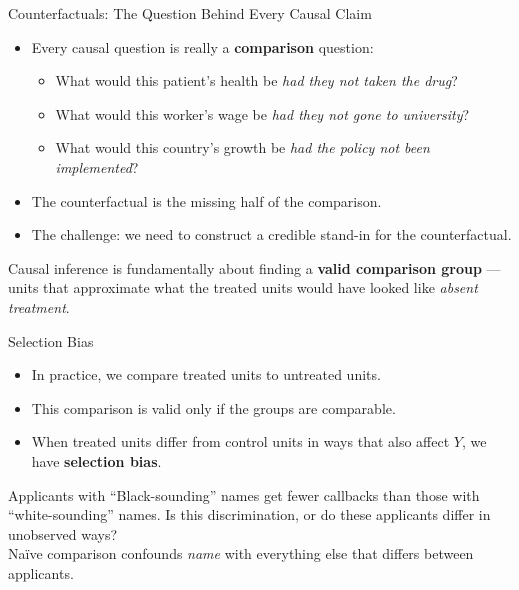 \documentclass[aspectratio=169, 11pt]{beamer}
\begin{document}
\begin{frame}[t]{Counterfactuals: The Question Behind Every Causal Claim}
\begin{itemize}
  \setlength\itemsep{0.5em}
  \item Every causal question is really a \textbf{comparison} question:
  \begin{itemize}
    \item What would this patient's health be \emph{had they not taken the drug}?
    \item What would this worker's wage be \emph{had they not gone to university}?
    \item What would this country's growth be \emph{had the policy not been implemented}?
  \end{itemize}
  \item The counterfactual is the missing half of the comparison.
  \item The challenge: we need to construct a credible stand-in for the counterfactual.
\end{itemize}
\vspace{0.4em}
\begin{intuitionbox}
Causal inference is fundamentally about finding a \textbf{valid comparison group}
— units that approximate what the treated units would have looked like \emph{absent treatment}.
\end{intuitionbox}
\end{frame}

\begin{frame}[t]{Selection Bias}
\begin{itemize}
  \setlength\itemsep{0.45em}
  \item In practice, we compare treated units to untreated units.
  \item This comparison is valid only if the groups are comparable.
  \item When treated units differ from control units in ways that also affect $Y$,
        we have \textbf{selection bias}.
\end{itemize}
\vspace{0.3em}
\begin{examplebox}
  \small
  Applicants with ``Black-sounding'' names get fewer callbacks than those with
  ``white-sounding'' names. Is this discrimination, or do these applicants differ
  in unobserved ways?\\[0.3em]
  Na\"ive comparison confounds \emph{name} with everything else that differs
  between applicants.
\end{examplebox}
\vspace{0.3em}
\end{frame}
\end{document}
